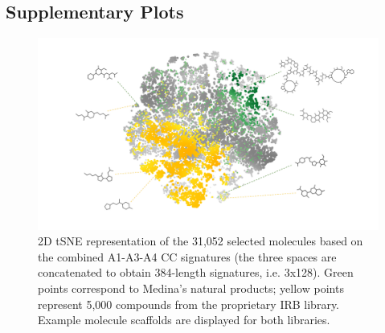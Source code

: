 \setcounter{section}{2} %
\setcounter{figure}{0}  %
\label{Navigation_SupplementaryInformation}



\subsection{Supplementary Plots}


\begin{figure}[ht]
  \centering
  \includegraphics[width=1\linewidth]{figures/Navigation/Supplementary/Medina_v.2.png}
  \caption{2D tSNE representation of the 31,052 selected molecules based on the combined A1-A3-A4 CC signatures (the three spaces are concatenated to obtain 384-length signatures, i.e. 3x128). Green points correspond to Medina’s natural products; yellow points represent 5,000 compounds from the proprietary IRB library. Example molecule scaffolds are displayed for both libraries.
  }
  \label{Navigation_FigS1}
\end{figure}



